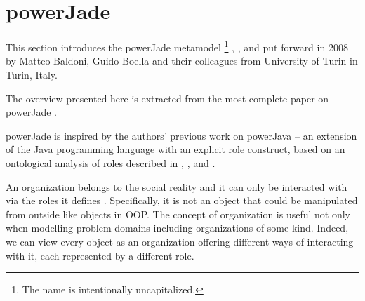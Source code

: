 
\section{powerJade}

This section introduces the powerJade metamodel
\footnote{The name is intentionally uncapitalized.}
\cite{Baldoni08a}, \cite{Baldoni08b}, \cite{Baldoni09} and \cite{Baldoni10}
put forward in 2008 by Matteo Baldoni, Guido Boella and their colleagues from University of Turin in Turin, Italy.

The overview presented here is extracted from the most complete paper on powerJade \cite{Baldoni10}.


powerJade is inspired by the authors' previous work on powerJava -- an extension of the Java programming language with an explicit role construct, based on an ontological analysis of roles described in \cite{Baldoni05}, \cite{Baldoni06a}, \cite{Baldoni06b} and \cite{Baldoni07}.

An organization belongs to the social reality and it can only be interacted with via the roles it defines \cite{Boella06}.
Specifically, it is not an object that could be manipulated from outside like objects in OOP.
The concept of organization is useful not only when modelling problem domains including organizations of some kind.
Indeed, we can view every object as an organization offering different ways of interacting with it, each represented by a different role.

